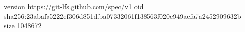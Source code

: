 version https://git-lfs.github.com/spec/v1
oid sha256:23abafa5222ef306d851dfba07332061f138563f020e949aefa7a2452909632b
size 1048672
